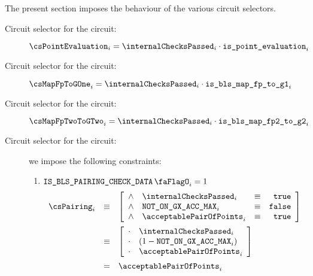 The present section imposes the behaviour of the various circuit selectors.
\begin{description}
    \item[Circuit selector for the  circuit:]
        $\csPointEvaluation_{i} = \internalChecksPassed_{i} \cdot \locIsPointEvaluation_{i}$
    \item[Circuit selector for the  circuit:]
        $\csMapFpToGOne_{i} = \internalChecksPassed_{i} \cdot \locIsBlsMapFpToGOne_{i}$
    \item[Circuit selector for the  circuit:]
        $\csMapFpTwoToGTwo_{i} = \internalChecksPassed_{i} \cdot \locIsBlsMapFpTwoToGTwo_{i}$
    \item[Circuit selector for the  circuit:]
    we impose the following constraints:
        \begin {enumerate}
            \item \If $\isBlsPairingCheckData_{i} = 1$ \Then  
                \[
                    \begin{array}{lcl}
                        \csPairing_{i} & \equiv &
                        \left[ \begin{array}{clcr}
                            \wedge & \internalChecksPassed_{i}   & \equiv & \texttt{true}  \\
                            \wedge & \notOnGXAccMax_{i}          & \equiv & \texttt{false} \\
                            \wedge & \acceptablePairOfPoints_{i} & \equiv & \texttt{true}  \\
                        \end{array} \right] \vspace{2mm} \\
                        & \equiv & 
                        \left[ \begin{array}{clcr}
                            \cdot & \internalChecksPassed_{i}   \\
                            \cdot & (1 - \notOnGXAccMax_{i})  \\
                            \cdot & \acceptablePairOfPoints_{i} \\
                        \end{array} \right] \vspace{2mm} \\
                        & =      & \acceptablePairOfPoints_{i} \\

\end{array}\]
\end{enumerate}
\end{description}
